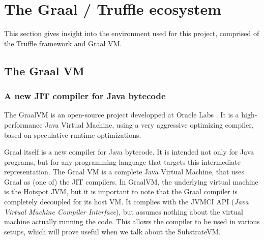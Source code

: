 \documentclass[twoside,11pt,a4paper]{article}
\newcommand{\startsection}[1]{
	\cleardoublepage
	\section{#1}
	\thispagestyle{basic}
}
\begin{document}
\startsection{The Graal / Truffle ecosystem}

This section gives insight into the environment used for this project, comprised of the Truffle framework and Graal VM.

\subsection{The Graal VM}



\subsubsection{A new JIT compiler for Java bytecode}

The GraalVM is an open-source project developped at Oracle Labs \cite{graalpage}. It is a high-performance Java Virtual Machine, using a very aggressive optimizing compiler, based on speculative runtime optimizations.


Graal itself is a new compiler for Java bytecode. It is intended not only for Java programs, but for any programming language that targets this intermediate representation. The Graal VM is a complete Java Virtual Machine, that uses Graal as (one of) the JIT compilers. In GraalVM, the underlying virtual machine is the Hotspot JVM, but it is important to note that the Graal compiler is completely decoupled for its host VM. It complies with the JVMCI API (\textit{Java Virtual Machine Compiler Interface}), but assumes nothing about the virtual machine actually running the code. This allows the compiler to be used in various setups, which will prove useful when we talk about the SubstrateVM.
\end{document}
